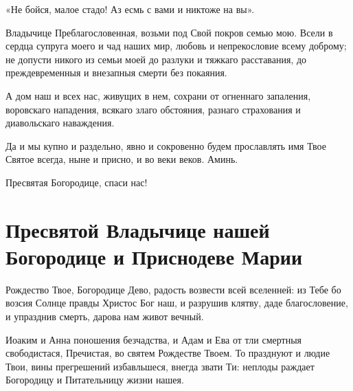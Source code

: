 «Не бойся, малое стадо! Аз есмь с вами и никтоже на вы».


Владычице Преблагословенная, возьми под Свой покров семью мою. Всели в сердца супруга моего и чад наших мир, любовь и непрекословие всему доброму;  не допусти никого из семьи моей до разлуки и тяжкаго расставания, до преждевременныя и внезапныя смерти без покаяния.

А дом наш и всех нас, живущих в нем, сохрани от огненнаго запаления, воровскаго нападения, всякаго злаго обстояния, разнаго страхования и диавольскаго наваждения.

Да и мы купно и раздельно, явно и сокровенно будем прославлять имя Твое Святое всегда, ныне и присно, и во веки веков. Аминь.


Пресвятая Богородице, спаси нас!
\mychapterending


 

{\noparindent\begin{minipage}{\textwidth}
\section{Пресвятой Владычице нашей Богородице и Приснодеве Марии}
\restoreparindent
{}


Рождество Твое, Богородице Дево, радость возвести всей вселенней: из Тебе бо возсия Солнце правды Христос Бог наш, и разрушив клятву, даде благословение, и упразднив смерть, дарова нам живот вечный.




Иоаким и Анна поношения безчадства, и Адам и Ева от тли смертныя свободистася, Пречистая, во святем Рождестве Твоем. То празднуют и людие Твои, вины прегрешений избавльшеся, внегда звати Ти: неплоды раждает Богородицу и Питательницу жизни нашея.

\end{minipage}}

